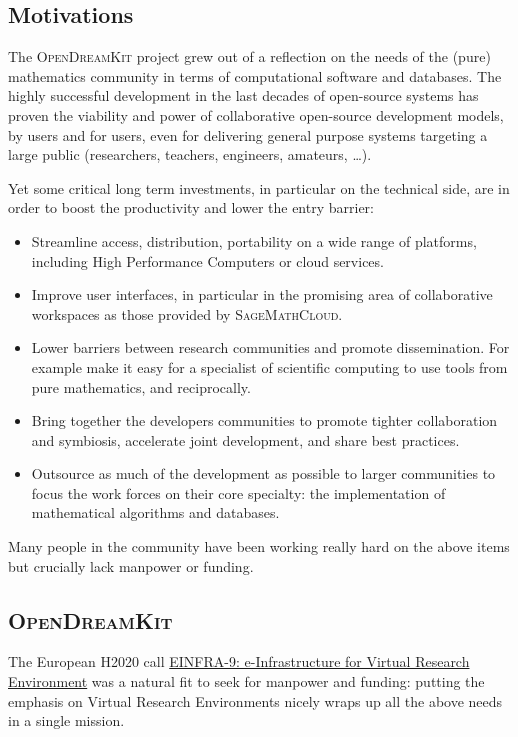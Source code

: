 \documentclass{llncs}
\newcommand{\software}[1]{\textsc{#1}\xspace}
\newcommand{\SMC}{\software{SageMathCloud}}
\newcommand{\ODK}{\software{OpenDreamKit}}
\begin{document}
\subsection{Motivations}

The \ODK project grew out of a reflection on the needs of the (pure) mathematics community
in terms of computational software and databases. The highly successful development in the
last decades of open-source systems has proven the viability and power of collaborative
open-source development models, by users and for users, even for delivering general
purpose systems targeting a large public (researchers, teachers, engineers, amateurs,
\ldots).

Yet some critical long term investments, in particular on the technical side, are in order
to boost the productivity and lower the entry barrier:

\begin{itemize}
\item Streamline access, distribution, portability on a wide range of
  platforms, including High Performance Computers or cloud services.
\item Improve user interfaces, in particular in the promising area of
  collaborative workspaces as those provided by \SMC.
\item Lower barriers between research communities and promote
  dissemination. For example make it easy for a specialist of
  scientific computing to use tools from pure mathematics, and
  reciprocally.
\item Bring together the developers communities to promote tighter
  collaboration and symbiosis, accelerate joint development, and share
  best practices.
\item Outsource as much of the development as possible to larger
  communities to focus the work forces on their core specialty: the
  implementation of mathematical algorithms and databases.
\end{itemize}

Many people in the community have been working really hard on the
above items but crucially lack manpower or funding.

\subsection{\ODK}

The European H2020 call
\href{http://ec.europa.eu/research/participants/portal/desktop/en/opportunities/h2020/topics/2144-einfra-9-2015.html}{EINFRA-9:
  e-Infrastructure for Virtual Research Environment} was a natural fit
to seek for manpower and funding: putting the emphasis on Virtual
Research Environments nicely wraps up all the above needs in a single
mission.
\end{document}
